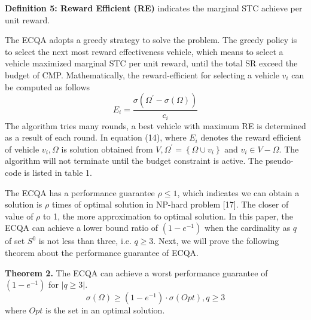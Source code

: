 \documentclass[journal]{IEEEtran}
\begin{document}
\noindent
\textbf{Definition 5: Reward Efficient (RE)} indicates the marginal STC achieve per unit reward.

The ECQA adopts a greedy strategy to solve the problem. The greedy policy is to select the next most reward effectiveness vehicle, which means to select a vehicle maximized marginal STC per unit reward, until the total SR exceed the budget of CMP. Mathematically, the reward-efficient for selecting a vehicle $v_{i}$ can be computed as follows
 \begin{equation}
 E_{i}=\frac{\sigma (\Omega ^{'}-\sigma (\Omega))}{c_{i}}
 \end{equation}
The algorithm tries many rounds, a best vehicle with maximum RE is determined as a result of each round. In equation (14), where $E_{i}$  denotes the reward efficient of vehicle $v_{i}, Ω$ is solution obtained from $V, \Omega ^{'}=\left \{ \Omega\cup v_{i}  \right \}$ and $v_{i}\in V-\Omega $. The algorithm will not terminate until the budget constraint is active. The pseudo-code is listed in table 1.


The ECQA has a performance guarantee $ \rho \leqslant 1$, which indicates we can obtain a solution is $\rho$ times of optimal solution in NP-hard problem [17]. The closer of value of $\rho$ to 1, the more approximation to optimal solution. In this paper, the ECQA can achieve a lower bound ratio of  $\left (1-e^{-1}  \right )$ when the cardinality as $q$ of set $S^{0}$ is not less than three, i.e. $q\geqslant 3$. Next, we will prove the following theorem about the performance guarantee of ECQA.

\noindent
\textbf{Theorem 2.} The ECQA can achieve a worst performance guarantee of  $\left (1-e^{-1}  \right )$ for $\left |q\geqslant 3 \right|$. 
 \begin{equation}
 \sigma (\Omega )\geqslant \left (1-e^{-1}  \right )\cdot \sigma (Opt), q\geqslant 3
 \end{equation}
 where $Opt$ is the set in an optimal solution.
 
\end{document}
